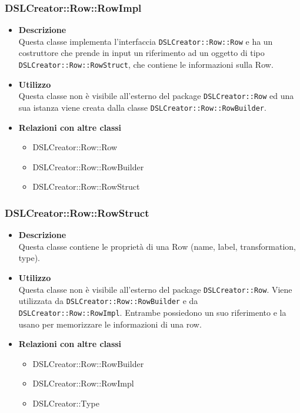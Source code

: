  \subsubsection{DSLCreator::Row::RowImpl}
                    \begin{itemize}
                        \item \textbf{Descrizione} \hfill \\
                          Questa classe implementa l'interfaccia \texttt{DSLCreator::Row::Row} e ha un costruttore che prende in input un riferimento ad un oggetto di tipo \texttt{DSLCreator::Row::RowStruct}, che contiene le informazioni sulla Row.
                        \item \textbf{Utilizzo} \hfill \\
                          Questa classe non è visibile all'esterno del package \texttt{DSLCreator::Row} ed una sua istanza viene creata dalla classe \texttt{DSLCreator::Row::RowBuilder}.
                        \item \textbf{Relazioni con altre classi}
                            \begin{itemize}
                              \item DSLCreator::Row::Row
                              \item DSLCreator::Row::RowBuilder
                              \item DSLCreator::Row::RowStruct
                            \end{itemize}
                    \end{itemize}  

 \subsubsection{DSLCreator::Row::RowStruct}
                    \begin{itemize}
                        \item \textbf{Descrizione} \hfill \\
                          Questa classe contiene le proprietà di una Row (name, label, transformation, type).
                        \item \textbf{Utilizzo} \hfill \\
                          Questa classe non è visibile all'esterno del package \texttt{DSLCreator::Row}. Viene utilizzata da \texttt{DSLCreator::Row::RowBuilder} e da \texttt{DSLCreator::Row::RowImpl}. Entrambe possiedono un suo riferimento e la usano per memorizzare le informazioni di una row.
                        \item \textbf{Relazioni con altre classi}
                            \begin{itemize}
                              \item DSLCreator::Row::RowBuilder
                              \item DSLCreator::Row::RowImpl
                              \item DSLCreator::Type
                            \end{itemize}
                    \end{itemize}  

